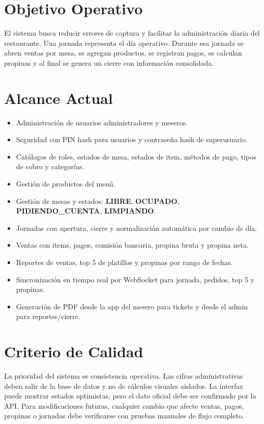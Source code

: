 \documentclass[11pt,letterpaper,openany]{report}
\newcommand{\estado}[1]{\textbf{\textcolor{PagodaTeal}{#1}}}
\begin{document}
\section{Objetivo Operativo}

El sistema busca reducir errores de captura y facilitar la administración diaria del restaurante. Una jornada representa el día operativo. Durante esa jornada se abren ventas por mesa, se agregan productos, se registran pagos, se calculan propinas y al final se genera un cierre con información consolidada.

\section{Alcance Actual}

\begin{itemize}[leftmargin=*]
  \item Administración de usuarios administradores y meseros.
  \item Seguridad con PIN hash para usuarios y contraseña hash de superusuario.
  \item Catálogos de roles, estados de mesa, estados de item, métodos de pago, tipos de cobro y categorías.
  \item Gestión de productos del menú.
  \item Gestión de mesas y estados: \estado{LIBRE}, \estado{OCUPADO}, \estado{PIDIENDO\_CUENTA}, \estado{LIMPIANDO}.
  \item Jornadas con apertura, cierre y normalización automática por cambio de día.
  \item Ventas con items, pagos, comisión bancaria, propina bruta y propina neta.
  \item Reportes de ventas, top 5 de platillos y propinas por rango de fechas.
  \item Sincronización en tiempo real por WebSocket para jornada, pedidos, top 5 y propinas.
  \item Generación de PDF desde la app del mesero para tickets y desde el admin para reportes/cierre.
\end{itemize}

\section{Criterio de Calidad}

La prioridad del sistema es consistencia operativa. Las cifras administrativas deben salir de la base de datos y no de cálculos visuales aislados. La interfaz puede mostrar estados optimistas, pero el dato oficial debe ser confirmado por la API. Para modificaciones futuras, cualquier cambio que afecte ventas, pagos, propinas o jornadas debe verificarse con pruebas manuales de flujo completo.
\end{document}
